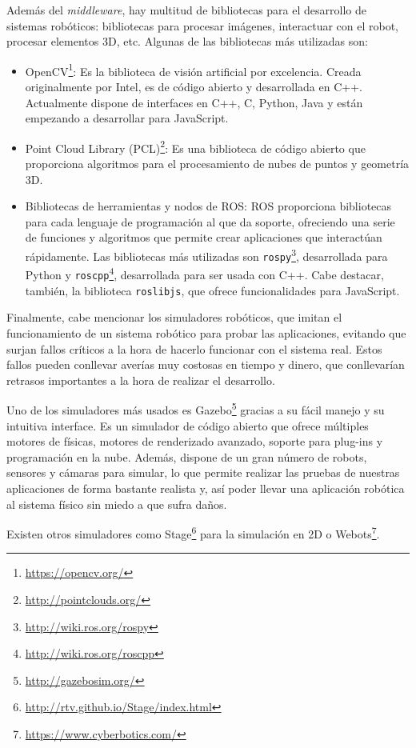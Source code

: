 Además del \textit{middleware}, hay multitud de bibliotecas para el desarrollo de sistemas robóticos: bibliotecas para procesar imágenes, interactuar con el robot, procesar elementos 3D, etc. Algunas de las bibliotecas más utilizadas son:
\begin{itemize}
	\item OpenCV\footnote{\url{https://opencv.org/}}: Es la biblioteca de visión artificial por excelencia. Creada originalmente por Intel, es de código abierto y desarrollada en C++. Actualmente dispone de interfaces en C++, C, Python, Java y están empezando a desarrollar para JavaScript.
	\item Point Cloud Library (PCL)\footnote{\url{http://pointclouds.org/}}: Es una biblioteca de código abierto que proporciona algoritmos para el procesamiento de nubes de puntos y geometría 3D.
	\item Bibliotecas de herramientas y nodos de ROS: ROS proporciona bibliotecas para cada lenguaje de programación al que da soporte, ofreciendo una serie de funciones y algoritmos que permite crear aplicaciones que interactúan rápidamente. Las bibliotecas más utilizadas son \texttt{rospy}\footnote{\url{http://wiki.ros.org/rospy}}, desarrollada para Python y \texttt{roscpp}\footnote{\url{http://wiki.ros.org/roscpp}}, desarrollada para ser usada con C++. Cabe destacar, también, la biblioteca \texttt{roslibjs}, que ofrece funcionalidades para JavaScript.
\end{itemize}

Finalmente, cabe mencionar los simuladores robóticos, que imitan el funcionamiento de un sistema robótico para probar las aplicaciones, evitando que surjan fallos críticos a la hora de hacerlo funcionar con el sistema real. Estos fallos pueden conllevar averías muy costosas en tiempo y dinero, que conllevarían retrasos importantes a la hora de realizar el desarrollo. 

Uno de los simuladores más usados es Gazebo\footnote{\url{http://gazebosim.org/}} gracias a su fácil manejo y su intuitiva interface. Es un simulador de código abierto que ofrece múltiples motores de físicas, motores de renderizado avanzado, soporte para plug-ins y programación en la nube. Además, dispone de un gran número de robots, sensores y cámaras para simular, lo que permite realizar las pruebas de nuestras aplicaciones de forma bastante realista y, así poder llevar una aplicación robótica al sistema físico sin miedo a que sufra daños.

Existen otros simuladores como Stage\footnote{\url{http://rtv.github.io/Stage/index.html}} para la simulación en 2D o Webots\footnote{\url{https://www.cyberbotics.com/}}.

